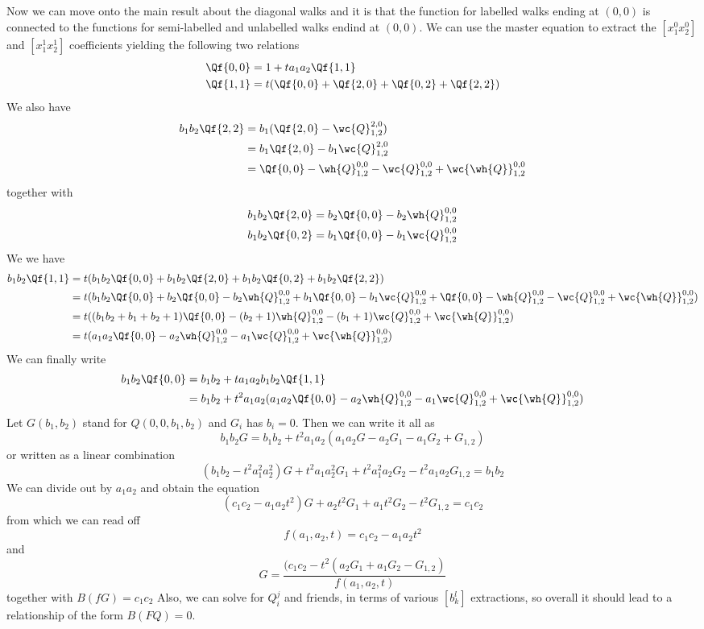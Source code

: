 Now we can move onto the main result about the diagonal walks and it is that the function for labelled walks ending at $(0,0)$ is connected to the functions for semi-labelled and unlabelled walks endind at $(0,0)$. We can use the master equation to extract the $[x_1^0x_2^0]$ and $[x_1^1x_2^1]$ coefficients yielding the following two relations
\begin{align*}
\Qf{0,0} &= 1 + ta_1a_2 \Qf{1,1}\\
\Qf{1,1} &= t(\Qf{0,0}+\Qf{2,0}+\Qf{0,2}+\Qf{2,2})
\end{align*}
We also have
\begin{align*}
b_1b_2\Qf{2,2} &= b_1(\Qf{2,0}-\wc{Q}_{1,2}^{2,0})\\
&= b_1 \Qf{2,0} - b_1\wc{Q}_{1,2}^{2,0}\\
&= \Qf{0,0}-\wh{Q}_{1,2}^{0,0}-\wc{Q}_{1,2}^{0,0}+\wc{\wh{Q}}_{1,2}^{0,0}
\end{align*}
together with
\begin{align*}
b_1b_2\Qf{2,0} &= b_2 \Qf{0,0} - b_2 \wh{Q}_{1,2}^{0,0}\\
b_1b_2\Qf{0,2} &= b_1 \Qf{0,0} - b_1 \wc{Q}_{1,2}^{0,0}
\end{align*}
We we have
\begin{align*}
b_1b_2\Qf{1,1} &= t(b_1b_2\Qf{0,0}+b_1b_2\Qf{2,0}+b_1b_2\Qf{0,2}+b_1b_2\Qf{2,2})\\
&= t(b_1b_2\Qf{0,0}+ b_2 \Qf{0,0} - b_2 \wh{Q}_{1,2}^{0,0}+ b_1 \Qf{0,0} - b_1 \wc{Q}_{1,2}^{0,0}+\Qf{0,0}-\wh{Q}_{1,2}^{0,0}-\wc{Q}_{1,2}^{0,0}+\wc{\wh{Q}}_{1,2}^{0,0})\\
&= t((b_1b_2+b_1+b_2+1)\Qf{0,0}-(b_2+1)\wh{Q}_{1,2}^{0,0}-(b_1+1)\wc{Q}_{1,2}^{0,0}+\wc{\wh{Q}}_{1,2}^{0,0})\\
&=t(a_1a_2\Qf{0,0}-a_2\wh{Q}_{1,2}^{0,0}-a_1\wc{Q}_{1,2}^{0,0}+\wc{\wh{Q}}_{1,2}^{0,0})
\end{align*}
We can finally write
\begin{align*}
b_1b_2\Qf{0,0} &= b_1b_2 + ta_1a_2b_1b_2\Qf{1,1}\\
& =  b_1b_2 + t^2a_1a_2(a_1a_2\Qf{0,0}-a_2\wh{Q}_{1,2}^{0,0}-a_1\wc{Q}_{1,2}^{0,0}+\wc{\wh{Q}}_{1,2}^{0,0})
\end{align*}
Let $G(b_1,b_2)$ stand for $Q(0,0,b_1,b_2)$ and $G_i$ has $b_i = 0$. Then we can write it all as
\[
   b_1b_2 G = b_1b_2 + t^2a_1a_2(a_1a_2G-a_2G_1-a_1G_2+G_{1,2})
\]
or written as a linear combination
\[
   (b_1b_2-t^2a_1^2a_2^2)G+t^2a_1a_2^2G_1 + t^2a_1^2a_2G_2 - t^2a_1a_2G_{1,2} = b_1b_2
\]
We can divide out by $a_1a_2$ and obtain the equation
\[
    (c_1c_2-a_1a_2t^2)G + a_2t^2G_1+a_1t^2G_2-t^2G_{1,2}=c_1c_2
\]
from which we can read off
\[
	f(a_1,a_2,t) = c_1c_2-a_1a_2t^2
\]
and
\[
    G = \frac{(c_1c_2-t^2(a_2G_1+a_1G_2-G_{1,2})}{f(a_1,a_2,t)}
\]
together with $B(fG) = c_1c_2$
Also, we can solve for $Q_i^j$ and friends, in terms of various $[b_k^l]$ extractions, so overall it should lead to a relationship of the form $B(FQ) = 0$.
